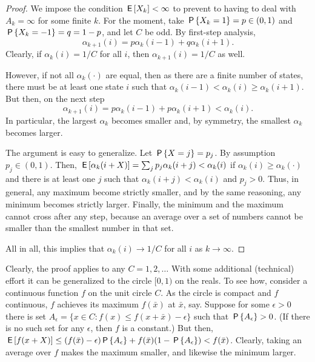 \documentclass[queueing-book.tex]{subfiles}
\begin{document}
\begin{proof}
We impose the condition $\E{X_{k}}<\infty$ to prevent to having to deal with $A_{k} = \infty$ for some finite $k$.
For the moment, take $\P{X_{k} = 1}=p \in (0, 1)$ and $\P{X_{k}=-1} = q=1-p$, and let $C$ be odd.
By first-step analysis,
\begin{equation*}
\alpha_{k+1}(i) = p \alpha_k(i-1) + q \alpha_k(i+1).
\end{equation*}
Clearly, if $\alpha_{k}(i)=1/C$ for all $i$, then $\alpha_{k+1}(i) = 1/C$ as well.

However, if not all $\alpha_{k}(\cdot)$ are equal, then as there are a finite number of states, there must be at least one state $i$ such that $\alpha_k(i-1) < \alpha_k(i) \geq \alpha_k(i+1)$.
But then, on the next step
\begin{equation*}
\alpha_{k+1}(i) = p \alpha_k(i-1) + p \alpha_k(i+1) < \alpha_k(i).
\end{equation*}
In particular, the largest $\alpha_{k}$ becomes smaller and, by symmetry, the smallest $\alpha_{k}$ becomes larger.

The argument is easy to generalize.
Let $\P{X=j} = p_{j}$.
By assumption $p_{j} \in (0, 1)$.
Then, $\E{\alpha_k(i+X)} = \sum_{j} p_{j} \alpha_k(i+j) < \alpha_k(i)$ if $\alpha_k(i) \geq \alpha_{k}(\cdot)$ and there is at least one $j$ such that $\alpha_k(i+j) < \alpha_k(i)$ and $p_{j} > 0$.
Thus, in general, any maximum become strictly smaller, and by the same reasoning, any minimum becomes strictly larger.
Finally, the minimum and the maximum cannot cross after any step, because an average over a set of numbers cannot be smaller than the smallest number in that set.

All in all, this implies that $\alpha_k(i) \to 1/C$ for all $i$ as $k\to \infty$.
\end{proof}

Clearly, the proof applies to any $C=1, 2, \ldots$
With some additional (technical) effort it can be generalized to the circle $[0, 1)$ on the reals.
To see how, consider a continuous function $f$ on the unit circle $C$.
As the circle is compact and $f$ continuous, $f$ achieves its maximum $f(\bar x)$ at $\bar x$, say.
Suppose for some $\epsilon>0$ there is set $A_{\epsilon} = \{x \in C: f(x) \leq f(x + \bar x) -\epsilon\}$ such that $\P{A_{\epsilon}} > 0$.
(If there is no such set for any $\epsilon$, then $f$ is a constant.)
But then, $\E{f(x+X)} \leq (f(\bar x) -\epsilon) \P{A_{\epsilon}} + f(\bar x) (1-\P{A_{\epsilon}}) < f(\bar x)$.
Clearly, taking an average over $f$ makes the maximum smaller, and likewise the minimum larger.
\end{document}
